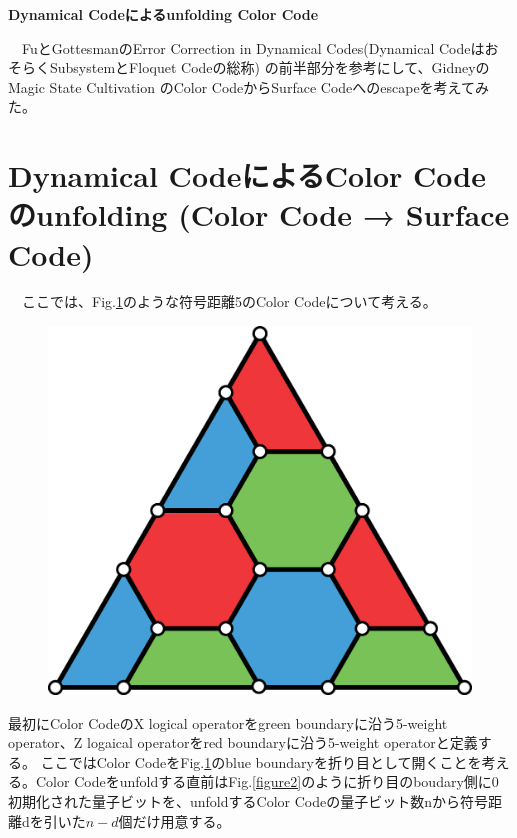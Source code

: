\documentclass[a4paper,9pt]{ltjsarticle}
\begin{document}
\centerline{\Large\bfseries Dynamical Codeによるunfolding Color Code}
\vspace{10pt}
　FuとGottesmanのError Correction in Dynamical Codes(Dynamical CodeはおそらくSubsystemとFloquet Codeの総称) \cite{fu2024}の前半部分を参考にして、GidneyのMagic State Cultivation \cite{gidney2024}のColor CodeからSurface Codeへのescapeを考えてみた。


\section{Dynamical CodeによるColor Codeのunfolding (Color Code → Surface Code)}{
    　ここでは、Fig.\ref{figure1}のような符号距離5のColor Codeについて考える。\\

    \begin{figure}[h]
        \centering
        \includegraphics[scale=0.15]{figure/figure1.eps}
        \vspace{10pt}\caption{}
        \label{figure1}
        \vspace{-15pt}
    \end{figure}

    最初にColor CodeのX logical operatorをgreen boundaryに沿う5-weight operator、Z logaical operatorをred boundaryに沿う5-weight operatorと定義する。
    ここではColor CodeをFig.\ref{figure1}のblue boundaryを折り目として開くことを考える。Color Codeをunfoldする直前はFig.\ref{figure2}のように折り目のboudary側に0初期化された量子ビットを、unfoldするColor Codeの量子ビット数nから符号距離dを引いた$n-d$個だけ用意する。

}
\end{document}
